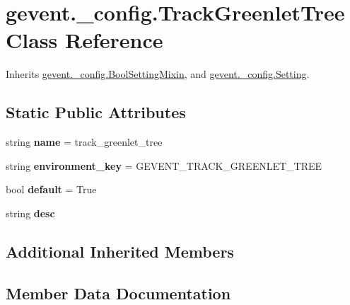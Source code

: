 \hypertarget{classgevent_1_1__config_1_1_track_greenlet_tree}{}\section{gevent.\+\_\+config.\+Track\+Greenlet\+Tree Class Reference}
\label{classgevent_1_1__config_1_1_track_greenlet_tree}


Inherits \hyperlink{classgevent_1_1__config_1_1_bool_setting_mixin}{gevent.\+\_\+config.\+Bool\+Setting\+Mixin}, and \hyperlink{classgevent_1_1__config_1_1_setting}{gevent.\+\_\+config.\+Setting}.

\subsection*{Static Public Attributes}
\begin{DoxyCompactItemize}
\item 
\mbox{\label{classgevent_1_1__config_1_1_track_greenlet_tree_a3375f58c393f5b1836edf1b2df26b120}} 
string {\bfseries name} = \textquotesingle{}track\+\_\+greenlet\+\_\+tree\textquotesingle{}
\item 
\mbox{\label{classgevent_1_1__config_1_1_track_greenlet_tree_a666d9ae567340037f42e5c0b504ad52d}} 
string {\bfseries environment\+\_\+key} = \textquotesingle{}G\+E\+V\+E\+N\+T\+\_\+\+T\+R\+A\+C\+K\+\_\+\+G\+R\+E\+E\+N\+L\+E\+T\+\_\+\+T\+R\+EE\textquotesingle{}
\item 
\mbox{\label{classgevent_1_1__config_1_1_track_greenlet_tree_a30ca66c8b4d7504ce4cd61c55e37197a}} 
bool {\bfseries default} = True
\item 
string {\bfseries desc}
\end{DoxyCompactItemize}
\subsection*{Additional Inherited Members}


\subsection{Member Data Documentation}
\mbox{\label{classgevent_1_1__config_1_1_track_greenlet_tree_a13ae9645a09e3af0ba9d4d94b2a29d39}} 

